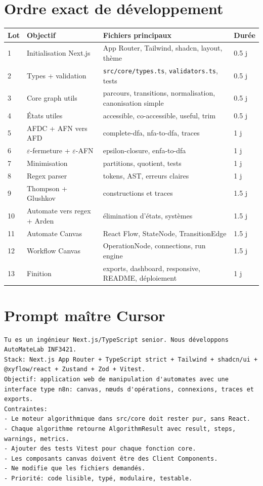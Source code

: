 \documentclass[11pt,a4paper]{report}
\newcommand{\code}[1]{\texttt{#1}}
\newcommand{\eps}{\ensuremath{\varepsilon}}
\begin{document}
\section{Ordre exact de développement}
\begin{longtable}{p{}p{}p{}p{}}
\toprule
\textbf{Lot} & \textbf{Objectif} & \textbf{Fichiers principaux} & \textbf{Durée}\\
\midrule
1 & Initialisation Next.js & App Router, Tailwind, shadcn, layout, thème & 0.5 j\\
2 & Types + validation & \code{src/core/types.ts}, \code{validators.ts}, tests & 0.5 j\\
3 & Core graph utils & parcours, transitions, normalisation, canonisation simple & 0.5 j\\
4 & États utiles & accessible, co-accessible, useful, trim & 0.5 j\\
5 & AFDC + AFN vers AFD & complete-dfa, nfa-to-dfa, traces & 1 j\\
6 & \eps-fermeture + \eps-AFN & epsilon-closure, enfa-to-dfa & 1 j\\
7 & Minimisation & partitions, quotient, tests & 1 j\\
8 & Regex parser & tokens, AST, erreurs claires & 1 j\\
9 & Thompson + Glushkov & constructions et traces & 1.5 j\\
10 & Automate vers regex + Arden & élimination d'états, systèmes & 1.5 j\\
11 & Automate Canvas & React Flow, StateNode, TransitionEdge & 1.5 j\\
12 & Workflow Canvas & OperationNode, connections, run engine & 1.5 j\\
13 & Finition & exports, dashboard, responsive, README, déploiement & 1 j\\
\bottomrule
\end{longtable}

\section{Prompt maître Cursor}
\begin{lstlisting}
Tu es un ingénieur Next.js/TypeScript senior. Nous développons AutoMateLab INF3421.
Stack: Next.js App Router + TypeScript strict + Tailwind + shadcn/ui + @xyflow/react + Zustand + Zod + Vitest.
Objectif: application web de manipulation d'automates avec une interface type n8n: canvas, nœuds d'opérations, connexions, traces et exports.
Contraintes:
- Le moteur algorithmique dans src/core doit rester pur, sans React.
- Chaque algorithme retourne AlgorithmResult avec result, steps, warnings, metrics.
- Ajouter des tests Vitest pour chaque fonction core.
- Les composants canvas doivent être des Client Components.
- Ne modifie que les fichiers demandés.
- Priorité: code lisible, typé, modulaire, testable.
\end{lstlisting}
\end{document}
